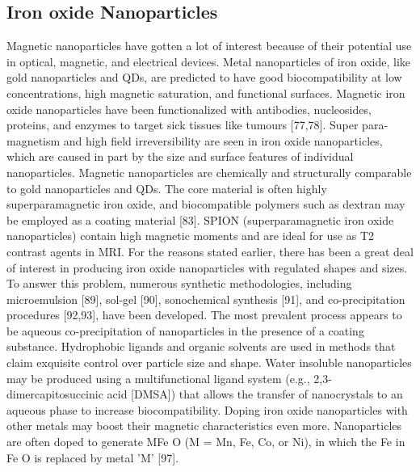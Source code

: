 \documentclass[12pt]{article}
\begin{document}
\subsection*{Iron oxide Nanoparticles}
Magnetic nanoparticles have gotten a lot of interest because of their potential use in optical, magnetic, and electrical devices. Metal nanoparticles of iron oxide, like gold nanoparticles and QDs, are predicted to have good biocompatibility at low concentrations, high magnetic saturation, and functional surfaces. Magnetic iron oxide nanoparticles have been functionalized with antibodies, nucleosides, proteins, and enzymes to target sick tissues like tumours [77,78]. Super para-magnetism and high field irreversibility are seen in iron oxide nanoparticles, which are caused in part by the size and surface features of individual nanoparticles. Magnetic nanoparticles are chemically and structurally comparable to gold nanoparticles and QDs. The core material is often highly superparamagnetic iron oxide, and biocompatible polymers such as dextran may be employed as a coating material [83]. SPION (superparamagnetic iron oxide nanoparticles) contain high magnetic moments and are ideal for use as T2 contrast agents in MRI.
For the reasons stated earlier, there has been a great deal of interest in producing iron oxide nanoparticles with regulated shapes and sizes. To answer this problem, numerous synthetic methodologies, including microemulsion [89], sol-gel [90], sonochemical synthesis [91], and co-precipitation procedures [92,93], have been developed. The most prevalent process appears to be aqueous co-precipitation of nanoparticles in the presence of a coating substance. Hydrophobic ligands and organic solvents are used in methods that claim exquisite control over particle size and shape. Water insoluble nanoparticles may be produced using a multifunctional ligand system (e.g., 2,3-dimercapitosuccinic acid [DMSA]) that allows the transfer of nanocrystals to an aqueous phase to increase biocompatibility. Doping iron oxide nanoparticles with other metals may boost their magnetic characteristics even more. Nanoparticles are often doped to generate MFe O (M = Mn, Fe, Co, or Ni), in which the Fe in Fe O is replaced by metal 'M' [97].
\end{document}
